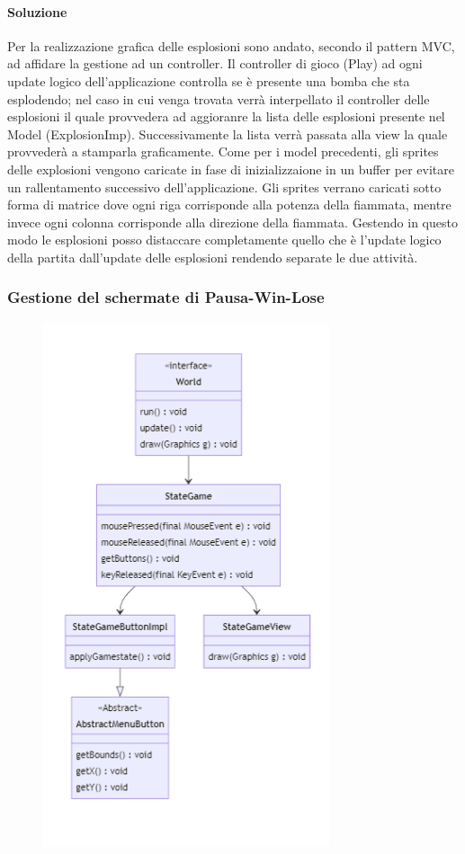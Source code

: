 \documentclass[a4paper,12pt]{report}
\begin{document}
\paragraph{Soluzione} Per la realizzazione grafica delle esplosioni sono andato, secondo il pattern MVC, ad affidare la gestione ad un controller. Il controller di gioco (Play) ad ogni update logico dell'applicazione controlla se è presente una bomba che sta esplodendo; nel caso in cui venga trovata verrà interpellato il controller delle esplosioni il quale provvedera ad aggioranre la lista delle esplosioni presente nel Model (ExplosionImp). Successivamente la lista verrà passata alla view la quale provvederà a stamparla graficamente. Come per i model precedenti, gli sprites delle explosioni vengono caricate in fase di inizializzaione in un buffer per evitare un rallentamento successivo dell'applicazione. Gli sprites verrano caricati sotto forma di matrice dove ogni riga corrisponde alla potenza della fiammata, mentre invece ogni colonna corrisponde alla direzione della fiammata. Gestendo in questo modo le esplosioni posso distaccare completamente quello che è l'update logico della partita dall'update delle esplosioni rendendo separate le due attività. 
\subsubsection{Gestione del schermate di Pausa-Win-Lose}

\begin{figure}[H]
    \centering{}
    \includegraphics[width=0.75\textwidth]{img/UMLSchermatePWL.png}
    \caption{}
\end{figure}
\end{document}
